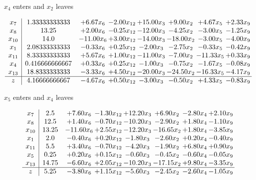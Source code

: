 \documentclass[8pt]{article}
\begin{document}
 $ x_{4} $ enters and $ x_{2} $ leaves 

 \[\begin{array}{c| c c@{\hskip 2pt} c@{\hskip 2pt} c@{\hskip 2pt} c@{\hskip 2pt} c@{\hskip 2pt} c@{\hskip 2pt} }
 x_{7}   &  1.33333333333 & +  6.67 x_{6} & -2.00 x_{12} & + 15.00 x_{3} & +  9.00 x_{2} & +  4.67 x_{5} & +  2.33 x_{9}\\
 x_{8}   &  13.25 & +  2.00 x_{6} & -0.25 x_{12} & -12.00 x_{3} & -4.25 x_{2} & -3.00 x_{5} & -1.25 x_{9}\\
 x_{10}   &  14.0 & -11.00 x_{6} & +  3.00 x_{12} & -14.00 x_{3} & -18.00 x_{2} & -3.00 x_{5} & -4.00 x_{9}\\
 x_{1}   &  2.08333333333 & -0.33 x_{6} & +  0.25 x_{12} & -2.00 x_{3} & -2.75 x_{2} & -0.33 x_{5} & -0.42 x_{9}\\
 x_{11}   &  8.33333333333 & +  5.67 x_{6} & +  1.00 x_{12} & -11.00 x_{3} & -7.00 x_{2} & -11.33 x_{5} & +  0.33 x_{9}\\
 x_{4}   &  0.416666666667 & +  0.33 x_{6} & +  0.25 x_{12} & -1.00 x_{3} & -0.75 x_{2} & -1.67 x_{5} & -0.08 x_{9}\\
 x_{13}   &  18.8333333333 & -3.33 x_{6} & +  4.50 x_{12} & -20.00 x_{3} & -24.50 x_{2} & -16.33 x_{5} & -4.17 x_{9}\\
\hline
z    &  4.16666666667 & -4.67 x_{6} & +  0.50 x_{12} & -3.00 x_{3} & -0.50 x_{2} & +  4.33 x_{5} & -0.83 x_{9}\\
\end{array}\]


 $ x_{5} $ enters and $ x_{4} $ leaves 

 \[\begin{array}{c| c c@{\hskip 2pt} c@{\hskip 2pt} c@{\hskip 2pt} c@{\hskip 2pt} c@{\hskip 2pt} c@{\hskip 2pt} }
 x_{7}   &  2.5 & +  7.60 x_{6} & -1.30 x_{12} & + 12.20 x_{3} & +  6.90 x_{2} & -2.80 x_{4} & +  2.10 x_{9}\\
 x_{8}   &  12.5 & +  1.40 x_{6} & -0.70 x_{12} & -10.20 x_{3} & -2.90 x_{2} & +  1.80 x_{4} & -1.10 x_{9}\\
 x_{10}   &  13.25 & -11.60 x_{6} & +  2.55 x_{12} & -12.20 x_{3} & -16.65 x_{2} & +  1.80 x_{4} & -3.85 x_{9}\\
 x_{1}   &  2.0 & -0.40 x_{6} & +  0.20 x_{12} & -1.80 x_{3} & -2.60 x_{2} & +  0.20 x_{4} & -0.40 x_{9}\\
 x_{11}   &  5.5 & +  3.40 x_{6} & -0.70 x_{12} & -4.20 x_{3} & -1.90 x_{2} & +  6.80 x_{4} & +  0.90 x_{9}\\
 x_{5}   &  0.25 & +  0.20 x_{6} & +  0.15 x_{12} & -0.60 x_{3} & -0.45 x_{2} & -0.60 x_{4} & -0.05 x_{9}\\
 x_{13}   &  14.75 & -6.60 x_{6} & +  2.05 x_{12} & -10.20 x_{3} & -17.15 x_{2} & +  9.80 x_{4} & -3.35 x_{9}\\
\hline
z    &  5.25 & -3.80 x_{6} & +  1.15 x_{12} & -5.60 x_{3} & -2.45 x_{2} & -2.60 x_{4} & -1.05 x_{9}\\
\end{array}\]
\end{document}
